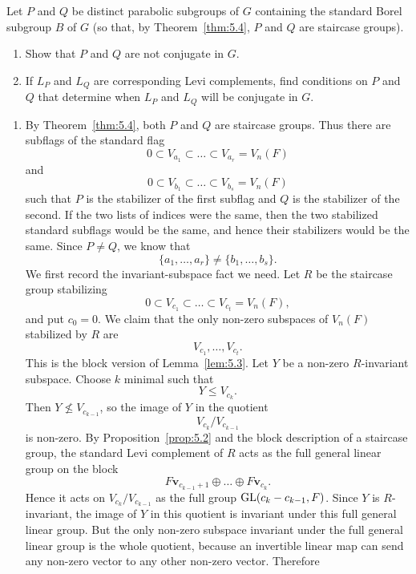 \documentclass[../Odyssey_Project.tex]{subfiles}
\begin{document}
\begin{exercise}
\label{ex:5.3}
Let $P$ and $Q$ be distinct parabolic subgroups of $G$ containing the standard Borel subgroup $B$ of $G$ (so that, by Theorem~\ref{thm:5.4}, $P$ and $Q$ are staircase groups).
\begin{enumerate}
    \item[(a)] Show that $P$ and $Q$ are not conjugate in $G$.
    \item[(b)] If $L_P$ and $L_Q$ are corresponding Levi complements, find conditions on $P$ and $Q$ that determine when $L_P$ and $L_Q$ will be conjugate in $G$.
\end{enumerate}
\end{exercise}
\begin{solution}
    \phantom{}\par
    \begin{enumerate}
        \item[(a)] By Theorem~\ref{thm:5.4}, both $P$ and $Q$ are staircase groups. Thus there are subflags of the standard flag
    \[
        0\subset V_{a_1}\subset \dots \subset V_{a_r}=V_n(F)
    \]
    and
    \[
        0\subset V_{b_1}\subset \dots \subset V_{b_s}=V_n(F)
    \]
    such that $P$ is the stabilizer of the first subflag and $Q$ is the stabilizer of the second. If the two lists of indices were the same, then the two stabilized standard subflags would be the same, and hence their stabilizers would be the same. Since $P\neq Q$, we know that
    \[
        \{a_1,\dots,a_r\}\neq \{b_1,\dots,b_s\}.
    \]
    We first record the invariant-subspace fact we need. Let $R$ be the staircase group stabilizing
    \[
        0\subset V_{c_1}\subset \dots \subset V_{c_t}=V_n(F),
    \]
    and put $c_0=0$. We claim that the only non-zero subspaces of $V_n(F)$ stabilized by $R$ are
    \[
        V_{c_1},\dots,V_{c_t}.
    \]
    This is the block version of Lemma~\ref{lem:5.3}. Let $Y$ be a non-zero $R$-invariant subspace. Choose $k$ minimal such that
    \[
        Y\leq V_{c_k}.
    \]
    Then $Y\not\leq V_{c_{k-1}}$, so the image of $Y$ in the quotient
    \[
        V_{c_k}/V_{c_{k-1}}
    \]
    is non-zero. By Proposition~\ref{prop:5.2} and the block description of a staircase group, the standard Levi complement of $R$ acts as the full general linear group on the block
    \[
        F\mathbf{v}_{c_{k-1}+1}\oplus \dots \oplus F\mathbf{v}_{c_k}.
    \]
    Hence it acts on $V_{c_k}/V_{c_{k-1}}$ as the full group $\operatorname{GL}(c_k-c_{k-1},F)$. Since $Y$ is $R$-invariant, the image of $Y$ in this quotient is invariant under this full general linear group. But the only non-zero subspace invariant under the full general linear group is the whole quotient, because an invertible linear map can send any non-zero vector to any other non-zero vector. Therefore

\end{enumerate}
\end{solution}
\end{document}
